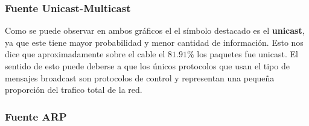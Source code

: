 \clearpage

\subsubsection{Fuente Unicast-Multicast}

\begin{figure}[hp!]
	\begin{minipage}[b]{0.9\linewidth}
	\end{minipage}
\end{figure}


Como se puede observar en ambos gráficos el el símbolo destacado es el
\textbf{unicast}, ya que este tiene mayor probabilidad y menor cantidad de
información. Esto nos dice que aproximadamente sobre el cable el $81.91\%$ los
paquetes fue unicast.  El sentido de esto puede deberse a que los únicos
protocolos que usan el tipo de mensajes broadcast son protocolos de control y
representan una pequeña proporción del trafico total de la red.

\subsubsection{Fuente ARP}

